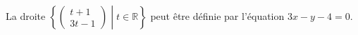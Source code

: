 La droite  $\left\{\begin{pmatrix}t+1\\3t-1\end{pmatrix}\middle| t\in\mathbb{R}\right\}$ peut être définie par l'équation $3x-y-4=0$.

\begin{reponses}
\end{reponses}

